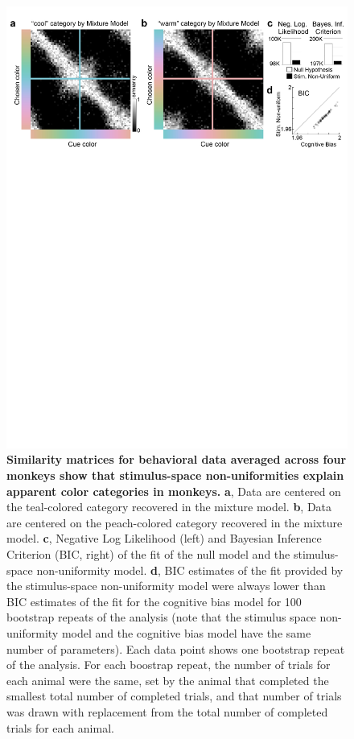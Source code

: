 \begin{figure}
    \begin{fullwidth}
    \centering
    \includegraphics[width=\textwidth+4cm,trim={0 19cm 0 0},clip]{../Figures/flat/F4_TCCResults_3.jpg}
    \caption{\textbf{Similarity matrices for behavioral data averaged across four monkeys show that stimulus-space non-uniformities explain apparent color categories in monkeys.}
    \textbf{a}, Data are centered on the teal-colored category recovered in the mixture model. 
	\textbf{b}, Data are centered on the peach-colored category recovered in the mixture model. 
	\textbf{c}, Negative Log Likelihood (left) and Bayesian Inference Criterion (BIC, right) of the fit of the null model and the stimulus-space non-uniformity model. 
	\textbf{d}, BIC estimates of the fit provided by the stimulus-space non-uniformity model were always lower than BIC estimates of the fit for the cognitive bias model for 100 bootstrap repeats of the analysis (note that the stimulus space non-uniformity model and the cognitive bias model have the same number of parameters). 
	Each data point shows one bootstrap repeat of the analysis. For each boostrap repeat, the number of trials for each animal were the same, set by the animal that completed the smallest total number of completed trials, and that number of trials was drawn with replacement from the total number of completed trials for each animal. 
    } 
    \label{fig:TCCOutput}
    \end{fullwidth}
\end{figure}

